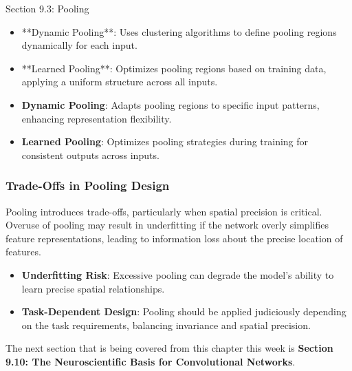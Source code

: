 \begin{notes}{Section 9.3: Pooling}
    \begin{itemize}
        \item **Dynamic Pooling**: Uses clustering algorithms to define pooling regions dynamically for each input.
        \item **Learned Pooling**: Optimizes pooling regions based on training data, applying a uniform structure across all inputs.
    \end{itemize}
    
    \begin{highlight}
        \begin{itemize}
            \item \textbf{Dynamic Pooling}: Adapts pooling regions to specific input patterns, enhancing representation flexibility.
            \item \textbf{Learned Pooling}: Optimizes pooling strategies during training for consistent outputs across inputs.
        \end{itemize}
    \end{highlight}
    
    \subsubsection*{Trade-Offs in Pooling Design}
    
    Pooling introduces trade-offs, particularly when spatial precision is critical. Overuse of pooling may result in underfitting if the network overly simplifies feature representations, leading to information 
    loss about the precise location of features.
    
    \begin{highlight}
        \begin{itemize}
            \item \textbf{Underfitting Risk}: Excessive pooling can degrade the model’s ability to learn precise spatial relationships.
            \item \textbf{Task-Dependent Design}: Pooling should be applied judiciously depending on the task requirements, balancing invariance and spatial precision.
        \end{itemize}
    \end{highlight}
\end{notes}

The next section that is being covered from this chapter this week is \textbf{Section 9.10: The Neuroscientific Basis for Convolutional Networks}.

